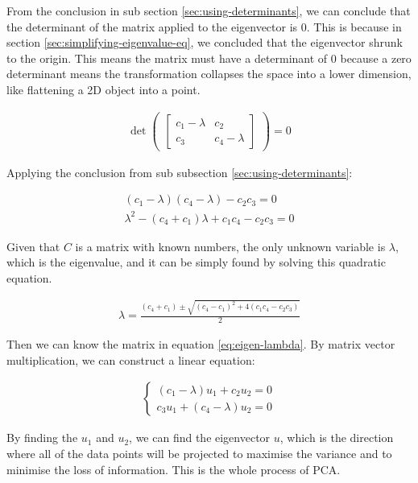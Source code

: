 \documentclass[stu,12pt,floatsintext]{apa7}
\begin{document}
From the conclusion in sub section \ref{sec:using-determinants}, we can conclude that the determinant of the matrix applied to the eigenvector is 0. This is because in section \ref{sec:simplifying-eigenvalue-eq}, we concluded that the eigenvector shrunk to the origin. This means the matrix must have a determinant of 0 because a zero determinant means the transformation collapses the space into a lower dimension, like flattening a 2D object into a point. 

\begin{gather}
    \det 
    \begin{pmatrix}
            \begin{bmatrix}
        c_1-\lambda & c_2\\
        c_3 & c_4-\lambda
    \end{bmatrix}
    \end{pmatrix}=0
\end{gather}

Applying the conclusion from sub subsection \ref{sec:using-determinants}:

\begin{gather}
    (c_1-\lambda)(c_4-\lambda)-c_2c_3=0\\
    \lambda^2-(c_4+c_1)\lambda+c_1c_4-c_2c_3=0
\end{gather}

Given that $C$ is a matrix with known numbers, the only unknown variable is $\lambda$, which is the eigenvalue, and it can be simply found by solving this quadratic equation. 

\begin{gather}
    \lambda = \frac{(c_4+c_1) \pm \sqrt{(c_4-c_1)^2 + 4(c_1c_4-c_2c_3)}}{2}
\end{gather}

Then we can know the matrix in equation \ref{eq:eigen-lambda}. By matrix vector multiplication, we can construct a linear equation:

\begin{gather}
    \begin{cases}
        (c_1-\lambda)u_1+c_2u_2=0\\
        c_3u_1+(c_4-\lambda)u_2=0
    \end{cases}
\end{gather}

By finding the $u_1$ and $u_2$, we can find the eigenvector $u$, which is the direction where all of the data points will be projected to maximise the variance and to minimise the loss of information. This is the whole process of PCA.
\end{document}
